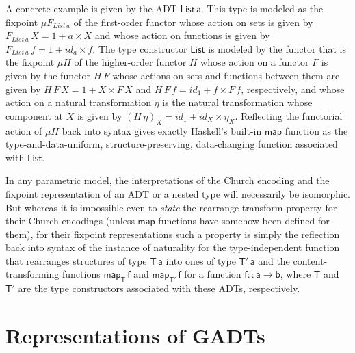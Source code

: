 \documentclass[submission,copyright,creativecommons]{eptcs}
\renewcommand{\id}{\mathit{id}}
\begin{document}
A concrete example is given by the ADT $\mathsf{List\,a}$. This type
is modeled as the fixpoint $\mu F_{\mathit{List\,a}}$ of the
first-order functor whose action on sets is given by
$F_{\mathit{List}\,a}\,X = 1 + a \times X$ and whose action on
functions is given by $F_{\mathit{List}\,a}\,f = 1 + \id_a \times
f$. The type constructor $\mathsf{List}$ is modeled by the functor
that is the fixpoint $\mu H$ of the higher-order functor $H$ whose
action on a functor $F$ is given by the functor $H\,F$ whose actions
on sets and functions between them are given by $H\,F\,X = 1 + X
\times F\,X$ and $H\,F\,f = \id_1 + f \times F\,f$, respectively, and
whose action on a natural transformation $\eta$ is the natural
transformation whose component at $X$ is given by $(H\,\eta)_X = \id_1
+ \id_X \times \eta_X$. Reflecting the functorial action of $\mu H$
back into syntax gives exactly Haskell's built-in $\mathsf{map}$
function as the type-and-data-uniform, structure-preserving,
data-changing function associated with $\mathsf{List}$.

\vspace*{0.05in}

In any parametric model, the interpretations of the Church encoding
and the fixpoint representation of an ADT or a nested type will
necessarily be isomorphic. But whereas it is impossible even to {\em
  state} the rearrange-transform property for their Church encodings
(unless $\mathsf{map}$ functions have somehow been defined for them),
for their fixpoint representations such a property is simply the
reflection back into syntax of the instance of naturality for the
type-independent function that rearranges structures of type
$\mathsf{T\,a}$ into ones of type $\mathsf{T'\,a}$ and the
content-transforming functions $\mathsf{map_T\,f}$ and
$\mathsf{map_{T'}\,f}$ for a function $\mathsf{f :: a \to b}$, where
$\mathsf{T}$ and $\mathsf{T'}$ are the type constructors associated
with these ADTs, respectively.

\section{Representations of GADTs}\label{sec:gadts}
\end{document}
